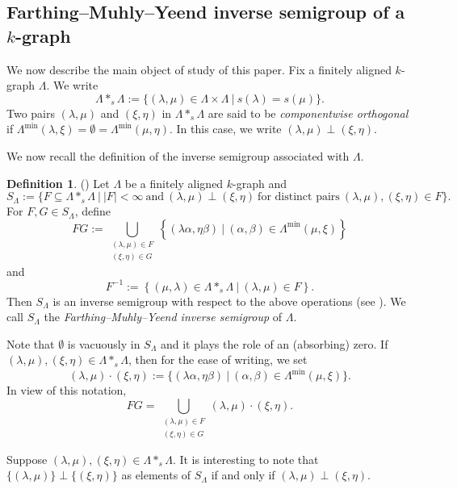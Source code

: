 \documentclass[a4paper,reqno,11pt]{amsart}
\numberwithin{equation}{section}
\theoremstyle{definition}
\newtheorem{dfn}[thm]{Definition}
\theoremstyle{remark}
\begin{document}
\subsection{Farthing--Muhly--Yeend inverse semigroup of a $k$-graph}\label{ssec The FMY inverse semigroup}
We now describe the main object of study of this paper. Fix a finitely aligned $k$-graph $\Lambda$. We write \[\Lambda *_s \Lambda:=\{(\lambda,\mu)\in \Lambda\times \Lambda~|~s(\lambda)=s(\mu)\}.\] Two pairs $(\lambda,\mu)$ and $(\xi,\eta)$ in $\Lambda *_s \Lambda$ are said to be \emph{componentwise orthogonal} if $\Lambda^{\min}(\lambda,\xi)=\emptyset=\Lambda^{\min}(\mu,\eta)$. In this case, we write $(\lambda,\mu) \perp (\xi,\eta)$. 

We now recall the definition of the inverse semigroup associated with $\Lambda$. 

\begin{dfn}\label{def the inverse semigroup S_Lambda}
(\cite[Definition 4.1]{Farthing}) Let $\Lambda$ be a finitely aligned $k$-graph and \[S_\Lambda:=\{F\subseteq \Lambda *_s \Lambda~|~|F|< \infty~\text{and}~(\lambda,\mu)\perp (\xi,\eta)~\text{for distinct pairs}~ (\lambda,\mu),(\xi,\eta)\in F\}.\] For $F,G\in S_\Lambda$, define \[FG:=\displaystyle{\bigcup_{\substack{(\lambda,\mu)\in F\\(\xi,\eta)\in G}}}\left\{(\lambda \alpha,\eta\beta)~|~(\alpha,\beta)\in \Lambda^{\min}(\mu,\xi)\right\}\] and \[F^{-1}:=\left\{(\mu,\lambda)\in \Lambda *_s \Lambda~|~(\lambda,\mu)\in F\right\}.\] Then $S_\Lambda$ is an inverse semigroup with respect to the above operations (see \cite[Proposition 4.3]{Farthing}). We call $S_\Lambda$ the \emph{Farthing--Muhly--Yeend inverse semigroup} of $\Lambda$. 
\end{dfn}

Note that $\emptyset$ is vacuously in $S_\Lambda$ and it plays the role of an (absorbing) zero. If $(\lambda,\mu),(\xi,\eta)\in \Lambda *_s \Lambda$, then for the ease of writing, we set \[(\lambda,\mu)\cdot (\xi,\eta):=\{(\lambda \alpha,\eta\beta)~|~(\alpha,\beta)\in \Lambda^{\min}(\mu,\xi)\}.\] In view of this notation, 
\begin{equation}\label{eq the multiplication}
FG=\displaystyle{\bigcup_{\substack{(\lambda,\mu)\in F\\(\xi,\eta)\in G}}}(\lambda,\mu)\cdot (\xi,\eta).
\end{equation}

Suppose $(\lambda,\mu),(\xi,\eta)\in \Lambda *_s \Lambda$. It is interesting to note that $\{(\lambda,\mu)\}\perp \{(\xi,\eta)\}$ as elements of $S_\Lambda$ if and only if $(\lambda,\mu)\perp (\xi,\eta)$. 
\end{document}
